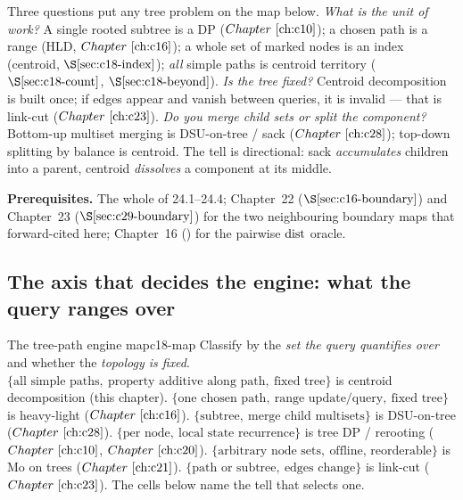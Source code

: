 \begin{topicintro}
Three questions put any tree problem on the map below. \emph{What is the unit of work?}
A single rooted subtree is a DP (\(\chref{c10}\)); a chosen path is a range (HLD,
\(\chref{c16}\)); a whole set of marked nodes is an index (centroid, \(\secref{c18-index}\));
\emph{all} simple paths is centroid territory (\(\secref{c18-count}\), \(\secref{c18-beyond}\)).
\emph{Is the tree fixed?} Centroid decomposition is built once; if edges appear and
vanish between queries, it is invalid --- that is link-cut (\(\chref{c23}\)). \emph{Do you
merge child sets or split the component?} Bottom-up multiset merging is DSU-on-tree /
sack (\(\chref{c28}\)); top-down splitting by balance is centroid. The tell is directional:
sack \emph{accumulates} children into a parent, centroid \emph{dissolves} a component at
its middle.

\textbf{Prerequisites.} The whole of 24.1--24.4; Chapter~22 (\(\secref{c16-boundary}\)) and
Chapter~23 (\(\secref{c29-boundary}\)) for the two neighbouring boundary maps that
forward-cited here; Chapter~16 () for the pairwise \(\operatorname{dist}\) oracle.
\end{topicintro}

\subsection{The axis that decides the engine: what the query ranges over}

\begin{definition}{The tree-path engine map}{c18-map}
Classify by the \emph{set the query quantifies over} and whether the \emph{topology is
fixed}. \(\{\text{all simple paths},\ \text{property additive along path},\ \text{fixed tree}\}\)
is centroid decomposition (this chapter). \(\{\text{one chosen path},\ \text{range
update/query},\ \text{fixed tree}\}\) is heavy-light (\(\chref{c16}\)).
\(\{\text{subtree},\ \text{merge child multisets}\}\) is DSU-on-tree (\(\chref{c28}\)).
\(\{\text{per node},\ \text{local state recurrence}\}\) is tree DP / rerooting
(\(\chref{c10}\), \(\chref{c20}\)). \(\{\text{arbitrary node sets},\ \text{offline,
reorderable}\}\) is Mo on trees (\(\chref{c21}\)). \(\{\text{path or subtree},\ \text{edges
change}\}\) is link-cut (\(\chref{c23}\)). The cells below name the tell that selects one.
\end{definition}

